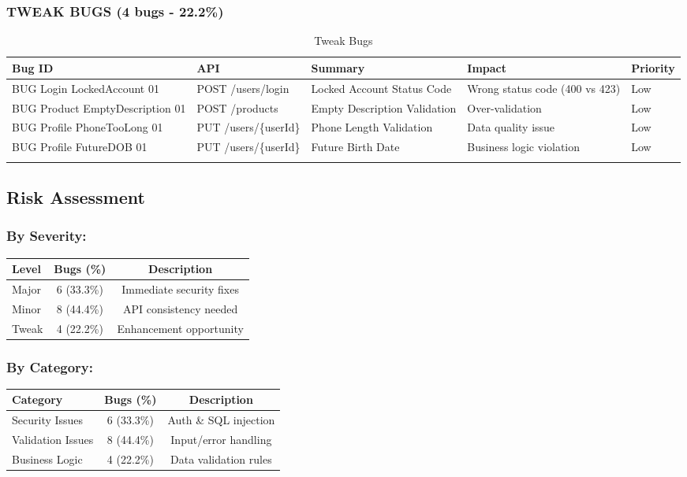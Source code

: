 \documentclass[12pt,a4paper]{article}
\begin{document}
  \subsubsection{TWEAK BUGS (4 bugs - 22.2\%)}

  \begin{longtable}{|p{3.2cm}|p{4cm}|p{3cm}|p{2.5cm}|p{1.5cm}|}
  \hline
  \textbf{Bug ID} & \textbf{API} & \textbf{Summary} & \textbf{Impact} & \textbf{Priority} \\
  \hline
  BUG Login LockedAccount 01 & POST /users/login & Locked Account Status Code & Wrong status code (400 vs 423) & Low \\
  \hline
  BUG Product EmptyDescription 01 & POST /products & Empty Description Validation & Over-validation & Low \\
  \hline
  BUG Profile PhoneTooLong 01 & PUT /users/\{userId\} & Phone Length Validation & Data quality issue & Low \\
  \hline
  BUG Profile FutureDOB 01 & PUT /users/\{userId\} & Future Birth Date & Business logic violation & Low \\
  \hline
  \caption{Tweak Bugs}
  \end{longtable}

  \subsection{Risk Assessment}

  \subsubsection{By Severity:}
  \begin{center}
  \begin{tabular}{|l|c|c|}
  \hline
  \textbf{Level} & \textbf{Bugs (\%)} & \textbf{Description} \\
  \hline
  Major & 6 (33.3\%) & Immediate security fixes \\
  \hline
  Minor & 8 (44.4\%) & API consistency needed \\
  \hline
  Tweak & 4 (22.2\%) & Enhancement opportunity \\
  \hline
  \end{tabular}
  \end{center}

  \vspace{0.5cm}

  \subsubsection{By Category:}
  \begin{center}
  \begin{tabular}{|l|c|c|}
  \hline
  \textbf{Category} & \textbf{Bugs (\%)} & \textbf{Description} \\
  \hline
  Security Issues & 6 (33.3\%) & Auth \& SQL injection \\
  \hline
  Validation Issues & 8 (44.4\%) & Input/error handling \\
  \hline
  Business Logic & 4 (22.2\%) & Data validation rules \\
  \hline
  \end{tabular}
  \end{center}
\end{document}

